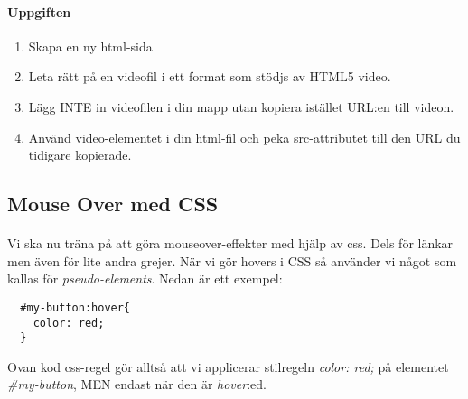 \documentclass{article}
\begin{document}
    \paragraph{Uppgiften}
      \begin{enumerate}
        \item Skapa en ny html-sida
        \item Leta rätt på en videofil i ett format som stödjs av HTML5 video.
        \item Lägg INTE in videofilen i din mapp utan kopiera istället URL:en till videon.
        \item Använd video-elementet i din html-fil och peka src-attributet till den URL du tidigare kopierade.
      \end{enumerate}






  \subsection{ Mouse Over med CSS }
    \paragraph{}
    Vi ska nu träna på att göra mouseover-effekter med hjälp av css. Dels för länkar men även för lite andra grejer. När vi gör hovers i CSS så använder vi något som kallas för \emph{pseudo-elements}. Nedan är ett exempel:
    \lstset{language=CSS}
    \begin{lstlisting}
  #my-button:hover{
    color: red;
  }
    \end{lstlisting}
    Ovan kod css-regel gör alltså att vi applicerar stilregeln \emph{color: red; } på elementet \emph{\#my-button}, MEN endast när den är \emph{hover}:ed.
\end{document}
